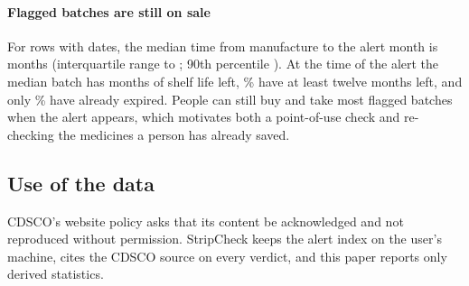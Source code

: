\paragraph{Flagged batches are still on sale}
For rows with dates, the median time from manufacture to the alert month is \LagMedian{} months (interquartile range \LagQOne{} to \LagQThree{}; 90th percentile \LagPNinety{}). At the time of the alert the median batch has \ShelfMedian{} months of shelf life left, \ShelfTwelvePlusPct\% have at least twelve months left, and only \ExpiredAtAlertPct\% have already expired. People can still buy and take most flagged batches when the alert appears, which motivates both a point-of-use check and re-checking the medicines a person has already saved.


\subsection{Use of the data}
CDSCO's website policy asks that its content be acknowledged and not reproduced without permission. StripCheck keeps the alert index on the user's machine, cites the CDSCO source on every verdict, and this paper reports only derived statistics.
